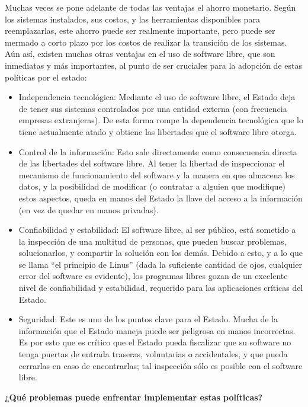 Muchas veces se pone adelante de todas las ventajas el ahorro monetario. Según los sistemas instalados, sus costos, y las herramientas disponibles para reemplazarlas, este ahorro puede ser realmente importante, pero puede ser mermado a corto plazo por los costos de realizar la transición de los sistemas.
Aún así, existen muchas otras ventajas en el uso de software libre, que son inmediatas y más importantes, al punto de ser cruciales para la adopción de estas políticas por el estado:
\begin{itemize}
\item  Independencia tecnológica: Mediante el uso de software libre, el Estado deja de tener sus sistemas controlados por una entidad externa (con frecuencia empresas extranjeras). De esta forma rompe la dependencia tecnológica que lo tiene actualmente atado y obtiene las libertades que el software libre otorga.
\item  Control de la información: Esto sale directamente como consecuencia directa de las libertades del software libre. Al tener la libertad de inspeccionar el mecanismo de funcionamiento del software y la manera en que almacena los datos, y la posibilidad de modificar (o contratar a alguien que modifique) estos aspectos, queda en manos del Estado la llave del acceso a la información (en vez de quedar en manos privadas).
\item  Confiabilidad y estabilidad: El software libre, al ser público, está sometido a la inspección de una multitud de personas, que pueden buscar problemas, solucionarlos, y compartir la solución con los demás. Debido a esto, y a lo que se llama “el principio de Linus” (dada la suficiente cantidad de ojos, cualquier error del software es evidente), los programas libres gozan de un excelente nivel de confiabilidad y estabilidad, requerido para las aplicaciones críticas del Estado.
\item  Seguridad: Este es uno de los puntos clave para el Estado. Mucha de la información que el Estado maneja puede ser peligrosa en manos incorrectas. Es por esto que es crítico que el Estado pueda fiscalizar que su software no tenga puertas de entrada traseras, voluntarias o accidentales, y que pueda cerrarlas en caso de encontrarlas; tal inspección sólo es posible con el software libre.
\end{itemize}

 {\bf¿Qué problemas puede enfrentar implementar estas políticas?}
 
